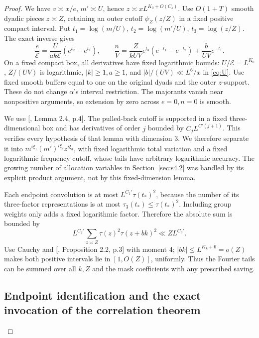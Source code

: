 \documentclass[11pt]{article}
\theoremstyle{definition}
\theoremstyle{definition}
\begin{document}
\begin{proof}
We have \(v\asymp x/e\), \(m'\asymp U\), hence \(z\asymp xL^{K_0+O(C_s)}\). Use \(O(1+T)\) smooth dyadic pieces \(z\asymp Z\), retaining an outer cutoff \(\psi_Z(z/Z)\) in a fixed positive compact interval. Put \(t_1=\log(m/U)\), \(t_2=\log(m'/U)\), \(t_3=\log(z/Z)\). The exact inverse gives
\begin{equation}
\frac e{\mathcal E}=\frac{U}{ak\mathcal E}(e^{t_2}-e^{t_1}),
 \qquad
 \frac nV=\frac{Z}{kUV}e^{t_3}(e^{-t_1}-e^{-t_2})
                         +\frac b{UV}e^{-t_1}.          \tag{4.14}\label{eq:4-14}
\end{equation}
On a fixed compact box, all derivatives have fixed logarithmic bounds: \(U/\mathcal E=L^{K_0}\), \(Z/(UV)\) is logarithmic, \(|k|\ge1,a\ge1\), and \(|b|/(UV)\ll L^6/x\) in \eqref{eq:U}. Use fixed smooth buffers equal to one on the original dyads and the outer \(z\)-support. These do not change \(\alpha\)'s interval restriction. The majorants vanish near nonpositive arguments, so extension by zero across \(e=0,n=0\) is smooth.

We use [, Lemma 2.4, p.4]. The pulled-back cutoff is supported in a fixed three-dimensional box and has derivatives of order \(j\) bounded by \(C_jL^{C'(j+1)}\). This verifies every hypothesis of that lemma with dimension 3. We therefore separate it into
\(m^{i\xi_1}(m')^{i\xi_2}z^{i\xi_3}\), with fixed logarithmic total variation and a fixed logarithmic frequency cutoff, whose tails have arbitrary logarithmic accuracy. The growing number of allocation variables in Section~\ref{sec:s4.2} was handled by its explicit product argument, not by this fixed-dimension lemma.

Each endpoint convolution is at most \(L^{C_1'}\tau(t_*)^2\), because the number of its three-factor representations is at most \(\tau_3(t_*)\le\tau(t_*)^2\). Including group weights only adds a fixed logarithmic factor. Therefore the absolute sum is bounded by
\begin{equation}
L^{C_2'}\sum_{z\asymp Z}\tau(z)^2\tau(z+bk)^2
 \ll ZL^{C_3'}.                                        \tag{4.15}\label{eq:4-15}
\end{equation}
Use Cauchy and [, Proposition 2.2, p.3] with moment 4; \(|bk|\le L^{K_k+6}=o(Z)\) makes both positive intervals lie in \([1,O(Z)]\), uniformly. Thus the Fourier tails can be summed over all \(k,Z\) and the mask coefficients with any prescribed saving.

\subsection{Endpoint identification and the exact invocation of the correlation theorem}\label{sec:s4.6}


\end{proof}
\end{document}
